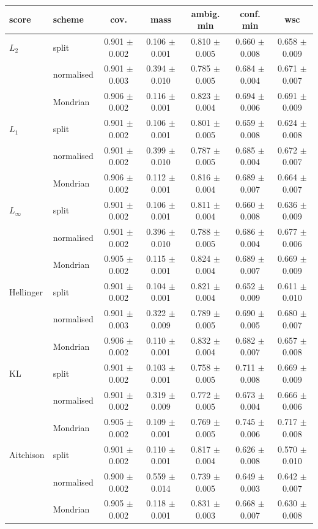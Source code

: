 \begin{tabular}{llccccc}
\toprule
score & scheme & cov. & mass & ambig. min & conf. min & wsc \\ \midrule
$L_2$ & split & 0.901 $\pm$ 0.002 & 0.106 $\pm$ 0.001 & 0.810 $\pm$ 0.005 & 0.660 $\pm$ 0.008 & 0.658 $\pm$ 0.009 \\
 & normalised & 0.901 $\pm$ 0.003 & 0.394 $\pm$ 0.010 & 0.785 $\pm$ 0.005 & 0.684 $\pm$ 0.004 & 0.671 $\pm$ 0.007 \\
 & Mondrian & 0.906 $\pm$ 0.002 & 0.116 $\pm$ 0.001 & 0.823 $\pm$ 0.004 & 0.694 $\pm$ 0.006 & 0.691 $\pm$ 0.009 \\
\addlinespace[2pt]
$L_1$ & split & 0.901 $\pm$ 0.002 & 0.106 $\pm$ 0.001 & 0.801 $\pm$ 0.005 & 0.659 $\pm$ 0.008 & 0.624 $\pm$ 0.008 \\
 & normalised & 0.901 $\pm$ 0.002 & 0.399 $\pm$ 0.010 & 0.787 $\pm$ 0.005 & 0.685 $\pm$ 0.004 & 0.672 $\pm$ 0.007 \\
 & Mondrian & 0.906 $\pm$ 0.002 & 0.112 $\pm$ 0.001 & 0.816 $\pm$ 0.004 & 0.689 $\pm$ 0.007 & 0.664 $\pm$ 0.007 \\
\addlinespace[2pt]
$L_\infty$ & split & 0.901 $\pm$ 0.002 & 0.106 $\pm$ 0.001 & 0.811 $\pm$ 0.004 & 0.660 $\pm$ 0.008 & 0.636 $\pm$ 0.009 \\
 & normalised & 0.901 $\pm$ 0.002 & 0.396 $\pm$ 0.010 & 0.788 $\pm$ 0.005 & 0.686 $\pm$ 0.004 & 0.677 $\pm$ 0.006 \\
 & Mondrian & 0.905 $\pm$ 0.002 & 0.115 $\pm$ 0.001 & 0.824 $\pm$ 0.004 & 0.689 $\pm$ 0.007 & 0.669 $\pm$ 0.009 \\
\addlinespace[2pt]
Hellinger & split & 0.901 $\pm$ 0.002 & 0.104 $\pm$ 0.001 & 0.821 $\pm$ 0.004 & 0.652 $\pm$ 0.009 & 0.611 $\pm$ 0.010 \\
 & normalised & 0.901 $\pm$ 0.003 & 0.322 $\pm$ 0.009 & 0.789 $\pm$ 0.005 & 0.690 $\pm$ 0.005 & 0.680 $\pm$ 0.007 \\
 & Mondrian & 0.906 $\pm$ 0.002 & 0.110 $\pm$ 0.001 & 0.832 $\pm$ 0.004 & 0.682 $\pm$ 0.007 & 0.657 $\pm$ 0.008 \\
\addlinespace[2pt]
KL & split & 0.901 $\pm$ 0.002 & 0.103 $\pm$ 0.001 & 0.758 $\pm$ 0.005 & 0.711 $\pm$ 0.008 & 0.669 $\pm$ 0.009 \\
 & normalised & 0.901 $\pm$ 0.002 & 0.319 $\pm$ 0.009 & 0.772 $\pm$ 0.005 & 0.673 $\pm$ 0.004 & 0.666 $\pm$ 0.006 \\
 & Mondrian & 0.905 $\pm$ 0.002 & 0.109 $\pm$ 0.001 & 0.769 $\pm$ 0.005 & 0.745 $\pm$ 0.006 & 0.717 $\pm$ 0.008 \\
\addlinespace[2pt]
Aitchison & split & 0.901 $\pm$ 0.002 & 0.110 $\pm$ 0.001 & 0.817 $\pm$ 0.004 & 0.626 $\pm$ 0.008 & 0.570 $\pm$ 0.010 \\
 & normalised & 0.900 $\pm$ 0.002 & 0.559 $\pm$ 0.014 & 0.739 $\pm$ 0.005 & 0.649 $\pm$ 0.003 & 0.642 $\pm$ 0.007 \\
 & Mondrian & 0.905 $\pm$ 0.002 & 0.118 $\pm$ 0.001 & 0.831 $\pm$ 0.003 & 0.668 $\pm$ 0.007 & 0.630 $\pm$ 0.008 \\
\bottomrule
\end{tabular}
